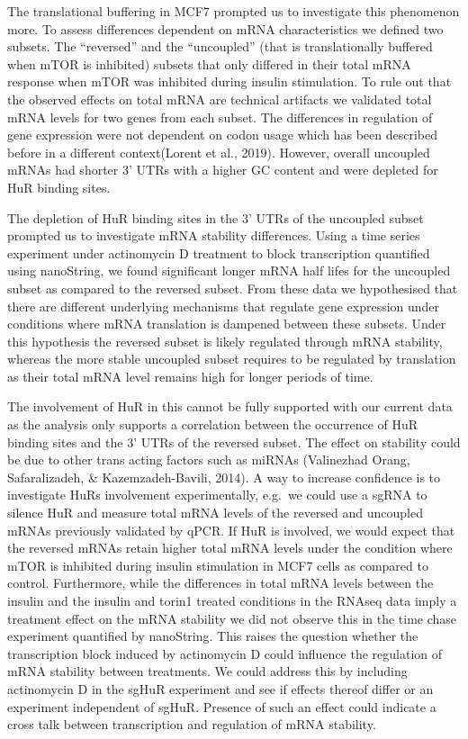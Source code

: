 \documentclass[12pt,openany]{book}
\begin{document}
The translational buffering in MCF7 prompted us to investigate this
phenomenon more. To assess differences dependent on mRNA characteristics
we defined two subsets. The ``reversed'' and the ``uncoupled'' (that is
translationally buffered when mTOR is inhibited) subsets that only
differed in their total mRNA response when mTOR was inhibited during
insulin stimulation. To rule out that the observed effects on total mRNA
are technical artifacts we validated total mRNA levels for two genes
from each subset. The differences in regulation of gene expression were
not dependent on codon usage which has been described before in a
different context(Lorent et al., 2019). However, overall uncoupled mRNAs
had shorter 3' UTRs with a higher GC content and were depleted for HuR
binding sites.

The depletion of HuR binding sites in the 3' UTRs of the uncoupled
subset prompted us to investigate mRNA stability differences. Using a
time series experiment under actinomycin D treatment to block
transcription quantified using nanoString, we found significant longer
mRNA half lifes for the uncoupled subset as compared to the reversed
subset. From these data we hypothesised that there are different
underlying mechanisms that regulate gene expression under conditions
where mRNA translation is dampened between these subsets. Under this
hypothesis the reversed subset is likely regulated through mRNA
stability, whereas the more stable uncoupled subset requires to be
regulated by translation as their total mRNA level remains high for
longer periods of time.

The involvement of HuR in this cannot be fully supported with our
current data as the analysis only supports a correlation between the
occurrence of HuR binding sites and the 3' UTRs of the reversed subset.
The effect on stability could be due to other trans acting factors such
as miRNAs (Valinezhad Orang, Safaralizadeh, \& Kazemzadeh-Bavili, 2014).
A way to increase confidence is to investigate HuRs involvement
experimentally, e.g.~we could use a sgRNA to silence HuR and measure
total mRNA levels of the reversed and uncoupled mRNAs previously
validated by qPCR. If HuR is involved, we would expect that the reversed
mRNAs retain higher total mRNA levels under the condition where mTOR is
inhibited during insulin stimulation in MCF7 cells as compared to
control. Furthermore, while the differences in total mRNA levels between
the insulin and the insulin and torin1 treated conditions in the RNAseq
data imply a treatment effect on the mRNA stability we did not observe
this in the time chase experiment quantified by nanoString. This raises
the question whether the transcription block induced by actinomycin D
could influence the regulation of mRNA stability between treatments. We
could address this by including actinomycin D in the sgHuR experiment
and see if effects thereof differ or an experiment independent of sgHuR.
Presence of such an effect could indicate a cross talk between
transcription and regulation of mRNA stability.
\end{document}
